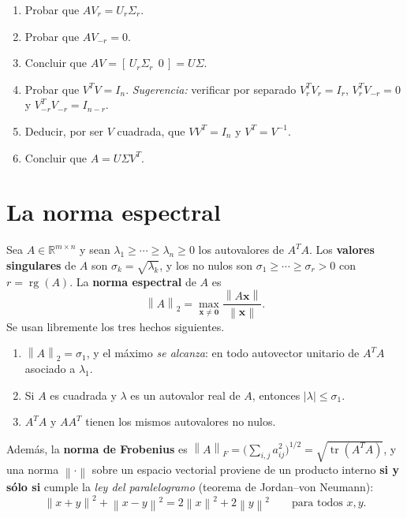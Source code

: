 \documentclass[11pt,a4paper]{article}
\newcommand{\R}{\mathbb{R}}
\newcommand{\bi}[1]{\boldsymbol{#1}}
\DeclareMathOperator{\rg}{rg}
\DeclareMathOperator{\tr}{tr}
\newcommand{\norm}[1]{\left\|#1\right\|}
\newcommand{\normF}[1]{\left\|#1\right\|_{F}}
\newcommand{\normdos}[1]{\left\|#1\right\|_{2}}
\begin{document}
\begin{enumerate}[label=\textbf{(\alph*)},itemsep=4pt,topsep=4pt,start=2]
\item Probar que $AV_r=U_r\Sigma_r$.
\item Probar que $AV_{-r}=0$.
\item Concluir que $AV=[\,U_r\Sigma_r\ \ 0\,]=U\Sigma$.
\item Probar que $V^TV=I_n$. \emph{Sugerencia:} verificar por separado
$V_r^TV_r=I_r$, $V_r^TV_{-r}=0$ y $V_{-r}^TV_{-r}=I_{n-r}$.
\item Deducir, por ser $V$ cuadrada, que $VV^T=I_n$ y $V^T=V^{-1}$.
\item Concluir que $A=U\Sigma V^T$.
\end{enumerate}

\section{La norma espectral}

\begin{manojo}
Sea $A\in\R^{m\times n}$ y sean $\lambda_1\ge\cdots\ge\lambda_n\ge0$ los
autovalores de $A^TA$. Los \textbf{valores singulares} de $A$ son
$\sigma_k=\sqrt{\lambda_k}$, y los no nulos son $\sigma_1\ge\cdots\ge\sigma_r>0$
con $r=\rg(A)$. La \textbf{norma espectral} de $A$ es
\[
\normdos{A}=\max_{\bi x\neq\bi 0}\frac{\norm{A\bi x}}{\norm{\bi x}} .
\]
Se usan libremente los tres hechos siguientes.
\begin{enumerate}[label=\textup{(R\arabic*)},leftmargin=*,itemsep=2pt,topsep=3pt]
\item $\normdos{A}=\sigma_1$, y el máximo \emph{se alcanza}: en todo
autovector unitario de $A^TA$ asociado a $\lambda_1$.
\item Si $A$ es cuadrada y $\lambda$ es un autovalor real de $A$, entonces
$|\lambda|\le\sigma_1$.
\item $A^TA$ y $AA^T$ tienen los mismos autovalores no nulos.
\end{enumerate}
Además, la \textbf{norma de Frobenius} es
$\normF{A}=\bigl(\sum_{i,j}a_{ij}^2\bigr)^{1/2}=\sqrt{\tr(A^TA)}$, y una
norma $\norm{\cdot}$ sobre un espacio vectorial proviene de un producto
interno \textbf{si y sólo si} cumple la \emph{ley del paralelogramo}
(teorema de Jordan--von Neumann):
\[
\norm{x+y}^2+\norm{x-y}^2=2\norm{x}^2+2\norm{y}^2
\qquad\text{para todos } x,y .
\]
\end{manojo}
\end{document}
